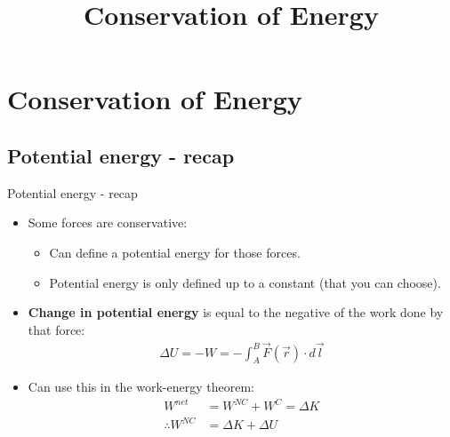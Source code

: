 \documentclass[aspectratio=169,
hyperref={colorlinks,urlcolor=blue}
]{beamer}
\begin{document}

\section{Conservation of Energy}
\label{sec:conservationofenergy}
\title{Conservation of Energy}
\author{\insertsubsection}


\begin{frame}
\titlepage
\thispagestyle{empty}
\end{frame}















\subsection{Potential energy - recap}
\label{subsec:potentialenergyrecap}
\begin{frame}{Potential energy - recap}
\begin{itemize}
\item Some forces are conservative:
\begin{itemize}
 \item[$\rightarrow$] Can define a potential energy for those forces.
 \item[$\rightarrow$] Potential energy is only defined up to a constant (that you can choose).
\end{itemize}

\item \textbf{Change in potential energy} is equal to the negative of the work done by that force:
\begin{align*}
\Delta U = -W=-\int_A^B \vec F(\vec r)\cdot d \vec l
\end{align*}
\item Can use this in the work-energy theorem:
\begin{align*}
W^{net}&=W^{NC}+W^C=\Delta K\\
\therefore W^{NC}&=\Delta K + \Delta U
\end{align*}
\end{itemize}

\end{frame}
\end{document}
